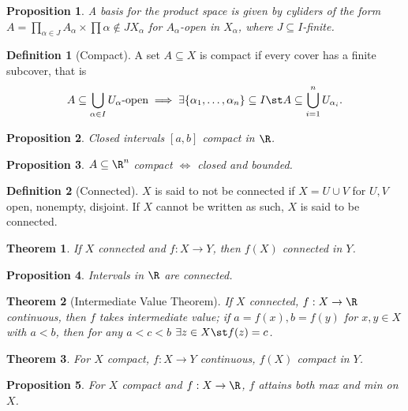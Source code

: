 \documentclass[12pt, oneside]{article}
\theoremstyle{definition}
\newtheorem{defn}{Definition}
\theoremstyle{plain}
\newtheorem{thm}{Theorem}
\newtheorem{prop}{Proposition}
\theoremstyle{remark}
\begin{document}
\begin{prop}
  A basis for the product space is given by cyliders of the form $A = \prod_{\alpha \in J} A_\alpha \times \prod{\alpha \notin J} X_\alpha$ for $A_\alpha$-open in $X_\alpha$, where $J \subseteq I$-finite.
\end{prop}

\begin{defn}[Compact]
  A set $A \subseteq X$ is compact if every cover has a finite subcover, that is \[
  A \subseteq \bigcup_{\alpha \in I} U_\alpha \text{-open} \implies \exists \{\alpha_1, \dots, \alpha_n\}   \subseteq I \st A \subseteq \bigcup_{i=1}^n U_{\alpha_i}.
  \]
\end{defn}

\begin{prop}
  Closed intervals $[a, b]$ compact in $\R$.
\end{prop}

\begin{prop}
  $A \subseteq \R^n$ compact $\iff $ closed and bounded.
\end{prop}

\begin{defn}[Connected]
  $X$ is said to not be connected if $X = U \cup V$ for $U, V$ open, nonempty, disjoint. If $X$ cannot be written as such, $X$ is said to be connected.
\end{defn}

\begin{thm}
  If $X$ connected and $f : X \to Y$, then $f(X)$ connected in $Y$.
\end{thm}

\begin{prop}
  Intervals in $\R$ are connected.
\end{prop}

\begin{thm}[Intermediate Value Theorem]
  If $X$ connected, $f : X \to \R$ continuous, then $f$ takes intermediate value; if $a = f(x), b = f(y)$ for $x, y \in X$ with $a < b$, then for any $a < c < b$ $\exists z \in X \st f(z) = c$.
\end{thm}

\begin{thm}
  For $X$ compact, $f : X \to Y$ continuous, $f(X)$ compact in $Y$.
\end{thm}

\begin{prop}
  For $X$ compact and $f: X \to \R$, $f$ attains both max and min on $X$.
\end{prop}
\end{document}
